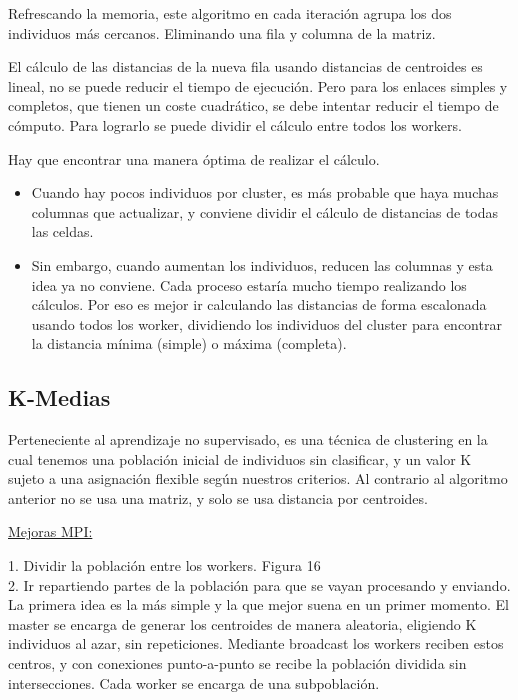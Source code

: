 		Refrescando la memoria, este algoritmo en cada iteración agrupa los dos individuos más cercanos. Eliminando una fila y columna de la matriz.
		
		\newpage
		
			
	
			
			
			
			
		
		El cálculo de las distancias de la nueva fila usando distancias de centroides es lineal, no se puede reducir el tiempo de ejecución. Pero para los enlaces simples y completos, que tienen un coste cuadrático, se debe intentar reducir el tiempo de cómputo. Para lograrlo se puede dividir el cálculo entre todos los workers. 
		
		Hay que encontrar una manera óptima de realizar el cálculo. 
		\begin{itemize}
			\item Cuando hay pocos individuos por cluster, es más probable que haya muchas columnas que actualizar, y conviene dividir el cálculo de distancias de todas las celdas. 
			\item Sin embargo, cuando aumentan los individuos, reducen las columnas y esta idea ya no conviene. Cada proceso estaría mucho tiempo realizando los cálculos. Por eso es mejor ir calculando las distancias de forma escalonada usando todos los worker, dividiendo los individuos del cluster para encontrar la distancia mínima (simple) o máxima (completa).
		\end{itemize}
		
		
		
		
	\subsection{K-Medias}
		Perteneciente al aprendizaje no supervisado, es una técnica de clustering en la cual tenemos una población inicial de individuos sin clasificar, y un valor K sujeto a una asignación flexible según nuestros criterios. Al contrario al algoritmo anterior no se usa una matriz, y solo se usa distancia por centroides.
		
		\begin{flushleft}
			\underline{Mejoras MPI:}
		\end{flushleft}
		1. Dividir la población entre los workers. Figura 16\\
		2. Ir repartiendo partes de la población para que se vayan procesando y enviando.\\
		
		La primera idea es la más simple y la que mejor suena en un primer momento. El master se encarga de generar los centroides de manera aleatoria, eligiendo K individuos al azar, sin repeticiones. Mediante broadcast los workers reciben estos centros, y con conexiones punto-a-punto se recibe la población dividida sin intersecciones. Cada worker se encarga de una subpoblación. 
		

